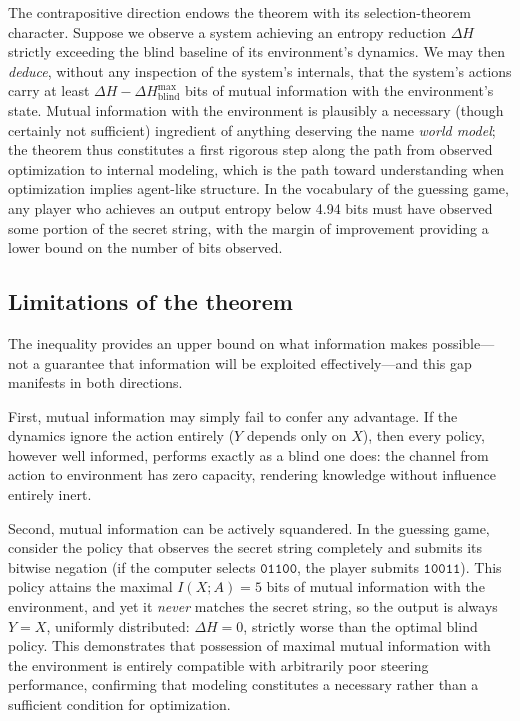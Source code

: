\documentclass[10pt]{article}
\theoremstyle{definition}
\theoremstyle{remark}
\begin{document}
The contrapositive direction endows the theorem with its selection-theorem character. Suppose we observe a system achieving an entropy reduction $\Delta H$ strictly exceeding the blind baseline of its environment's dynamics. We may then \emph{deduce}, without any inspection of the system's internals, that the system's actions carry at least $\Delta H - \Delta H^{\max}_{\text{blind}}$ bits of mutual information with the environment's state. Mutual information with the environment is plausibly a necessary (though certainly not sufficient) ingredient of anything deserving the name \emph{world model}; the theorem thus constitutes a first rigorous step along the path from observed optimization to internal modeling, which is the path toward understanding when optimization implies agent-like structure. In the vocabulary of the guessing game, any player who achieves an output entropy below 4.94 bits must have observed some portion of the secret string, with the margin of improvement providing a lower bound on the number of bits observed.

\subsection{Limitations of the theorem}
\label{sec:tlcaveats}

The inequality provides an upper bound on what information makes possible---not a guarantee that information will be exploited effectively---and this gap manifests in both directions.

First, mutual information may simply fail to confer any advantage. If the dynamics ignore the action entirely ($Y$ depends only on $X$), then every policy, however well informed, performs exactly as a blind one does: the channel from action to environment has zero capacity, rendering knowledge without influence entirely inert.

Second, mutual information can be actively squandered. In the guessing game, consider the policy that observes the secret string completely and submits its bitwise negation (if the computer selects $\texttt{01100}$, the player submits $\texttt{10011}$). This policy attains the maximal $I(X;A) = 5$ bits of mutual information with the environment, and yet it \emph{never} matches the secret string, so the output is always $Y = X$, uniformly distributed: $\Delta H = 0$, strictly worse than the optimal blind policy. This demonstrates that possession of maximal mutual information with the environment is entirely compatible with arbitrarily poor steering performance, confirming that modeling constitutes a necessary rather than a sufficient condition for optimization.
\end{document}
